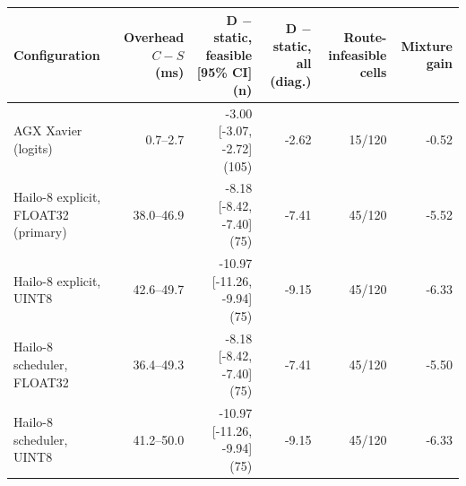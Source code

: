 \begin{tabular}{@{}lrrrrr@{}}
\toprule
Configuration & Overhead $C-S$ (ms) & D $-$ static, feasible [95\% CI] (n) & D $-$ static, all (diag.) & Route-infeasible cells & Mixture gain \\
\midrule
AGX Xavier (logits) & 0.7--2.7 & -3.00 [-3.07, -2.72] (105) & -2.62 & 15/120 & -0.52 \\
Hailo-8 explicit, FLOAT32 (primary) & 38.0--46.9 & -8.18 [-8.42, -7.40] (75) & -7.41 & 45/120 & -5.52 \\
Hailo-8 explicit, UINT8 & 42.6--49.7 & -10.97 [-11.26, -9.94] (75) & -9.15 & 45/120 & -6.33 \\
Hailo-8 scheduler, FLOAT32 & 36.4--49.3 & -8.18 [-8.42, -7.40] (75) & -7.41 & 45/120 & -5.50 \\
Hailo-8 scheduler, UINT8 & 41.2--50.0 & -10.97 [-11.26, -9.94] (75) & -9.15 & 45/120 & -6.33 \\
\bottomrule
\end{tabular}
